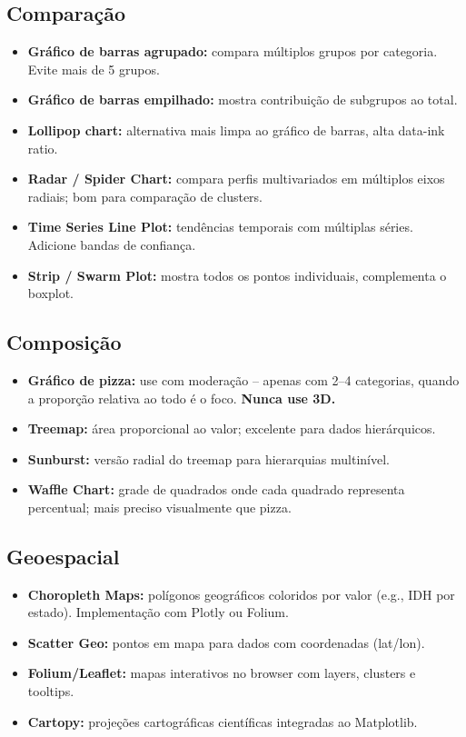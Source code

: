 \documentclass[12pt,a4paper]{article}
\begin{document}
\subsection{Comparação}

\begin{itemize}
  \item \textbf{Gráfico de barras agrupado:} compara múltiplos grupos por categoria. Evite mais de 5 grupos.
  \item \textbf{Gráfico de barras empilhado:} mostra contribuição de subgrupos ao total.
  \item \textbf{Lollipop chart:} alternativa mais limpa ao gráfico de barras, alta data-ink ratio.
  \item \textbf{Radar / Spider Chart:} compara perfis multivariados em múltiplos eixos radiais; bom para comparação de clusters.
  \item \textbf{Time Series Line Plot:} tendências temporais com múltiplas séries. Adicione bandas de confiança.
  \item \textbf{Strip / Swarm Plot:} mostra todos os pontos individuais, complementa o boxplot.
\end{itemize}

\subsection{Composição}

\begin{itemize}
  \item \textbf{Gráfico de pizza:} use com moderação -- apenas com 2--4 categorias, quando a proporção relativa ao todo é o foco. \textbf{Nunca use 3D.}
  \item \textbf{Treemap:} área proporcional ao valor; excelente para dados hierárquicos.
  \item \textbf{Sunburst:} versão radial do treemap para hierarquias multinível.
  \item \textbf{Waffle Chart:} grade de quadrados onde cada quadrado representa percentual; mais preciso visualmente que pizza.
\end{itemize}

\subsection{Geoespacial}

\begin{itemize}
  \item \textbf{Choropleth Maps:} polígonos geográficos coloridos por valor (e.g., IDH por estado). Implementação com Plotly ou Folium.
  \item \textbf{Scatter Geo:} pontos em mapa para dados com coordenadas (lat/lon).
  \item \textbf{Folium/Leaflet:} mapas interativos no browser com layers, clusters e tooltips.
  \item \textbf{Cartopy:} projeções cartográficas científicas integradas ao Matplotlib.
\end{itemize}
\end{document}
